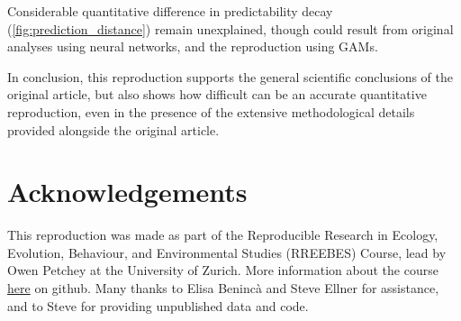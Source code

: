 \documentclass[10pt,a4paper,onecolumn]{article}
\begin{document}
Considerable quantitative difference in predictability decay
(\ref{fig:prediction_distance}) remain unexplained, though could result
from original analyses using neural networks, and the reproduction using
GAMs.

In conclusion, this reproduction supports the general scientific
conclusions of the original article, but also shows how difficult can be
an accurate quantitative reproduction, even in the presence of the
extensive methodological details provided alongside the original
article.

\section{Acknowledgements}\label{acknowledgements}

This reproduction was made as part of the Reproducible Research in
Ecology, Evolution, Behaviour, and Environmental Studies (RREEBES)
Course, lead by Owen Petchey at the University of Zurich. More
information about the course
\href{https://github.com/opetchey/RREEBES/blob/master/README.md}{here}
on github. Many thanks to Elisa Benincà and Steve Ellner for assistance,
and to Steve for providing unpublished data and code.

{\sffamily \small
  \printbibliography[title=References]
}
\end{document}
